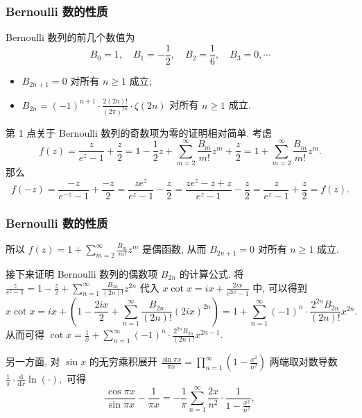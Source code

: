 
\begin{frame}
\frametitle{Bernoulli 数的性质}

Bernoulli 数列的前几个数值为
\[
B_0 = 1, \quad B_1 = -\frac{1}{2}, \quad B_2 = \frac{1}{6}, \quad B_3 = 0, \cdots
\]

\pause
\vspace{0.5em}

\begin{prop}
\begin{itemize}
\item $B_{2n+1} = 0$ 对所有 $n \geqslant 1$ 成立;
\item $B_{2n} = (-1)^{n+1} \cdot \frac{2 (2n)!}{(2\pi)^{2n}} \cdot \zeta(2n)$ 对所有 $n \geqslant 1$ 成立.
\end{itemize}
\end{prop}

\pause
\vspace{0.5em}

 第 1 点关于 Bernoulli 数列的奇数项为零的证明相对简单. 考虑
\[
f(z) = \frac{z}{e^z - 1} + \frac{z}{2} = 1 - \frac{1}{2} z + \sum_{m=2}^\infty \frac{B_m}{m!} z^m + \frac{z}{2} = 1 + \sum_{m=2}^\infty \frac{B_m}{m!} z^m.
\]
那么
\[
f(-z) = \frac{-z}{e^{-z} - 1} + \frac{-z}{2} = \frac{z e^z}{e^z - 1} - \frac{z}{2} = \frac{z e^z - z + z}{e^z - 1} - \frac{z}{2} = \frac{z}{e^z - 1} + \frac{z}{2} = f(z).
\]

\end{frame}


\begin{frame}
\frametitle{Bernoulli 数的性质}

所以 $f(z) = 1 + \sum_{m=2}^\infty \frac{B_m}{m!} z^m$ 是偶函数, 从而 $B_{2n+1} = 0$ 对所有 $n \geqslant 1$ 成立.

\pause
\vspace{0.5em}

{\color{red} } 接下来证明 Bernoulli 数列的偶数项 $B_{2n}$ 的计算公式. 将 $\frac{z}{e^z - 1} = 1 - \frac{z}{2} + \sum_{n=1}^\infty \frac{B_{2n}}{(2n)!} z^{2n}$ 代入 $x \cot x = ix + \frac{2ix}{e^{2ix} - 1}$ 中, 可以得到
\[
x \cot x = ix + \left( 1 - \frac{2ix}{2} + \sum_{n=1}^\infty \frac{B_{2n}}{(2n)!} (2ix)^{2n} \right) = 1 + \sum_{n=1}^\infty (-1)^n \cdot \frac{2^{2n} B_{2n}}{(2n)!} x^{2n}.
\]
从而可得 $\cot x = \frac{1}{x} + \sum_{n=1}^\infty (-1)^n \cdot \frac{2^{2n} B_{2n}}{(2n)!} x^{2n-1}.$

\pause
\vspace{0.5em}

另一方面, 对 $\sin x$ 的无穷乘积展开 $\frac{\sin \pi x}{\pi x} = \prod_{n=1}^\infty \left( 1 - \frac{x^2}{n^2} \right)$ 两端取对数导数 $\frac{1}{\pi} \cdot \frac{\mathrm{d}}{\mathrm{d}x} \ln ( \cdot ),$ 可得
\[
\frac{\cos \pi x}{\sin \pi x} - \frac{1}{\pi x} = - \frac{1}{\pi} \sum_{n=1}^\infty \frac{2x}{n^2} \cdot \frac{1}{1 - \frac{x^2}{n^2}},
\]

\end{frame}

